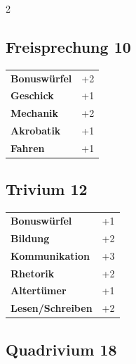 \begin{multicols}{2}
\begin{tcolorbox}
    \subsection*{Freisprechung \hfill \small{10 }}
    \tcblower




\begin{tabular}{@{}ll@{}}
    \textbf{Bonuswürfel} & +2\\
    \textbf{Geschick} & +1\\
    \textbf{Mechanik} & +2\\
    \textbf{Akrobatik} & +1\\
    \textbf{Fahren} & +1\\
\end{tabular}


\end{tcolorbox}

\begin{tcolorbox}
    \subsection*{Trivium \hfill \small{12 }}
    \tcblower




\begin{tabular}{@{}ll@{}}
    \textbf{Bonuswürfel} & +1\\
    \textbf{Bildung} & +2\\
    \textbf{Kommunikation} & +3\\
    \textbf{Rhetorik} & +2\\
    \textbf{Altertümer} & +1\\
    \textbf{Lesen/Schreiben} & +2\\
\end{tabular}


\end{tcolorbox}

\begin{tcolorbox}
    \subsection*{Quadrivium \hfill \small{18 }}
    \tcblower





\end{tcolorbox}
\end{multicols}
